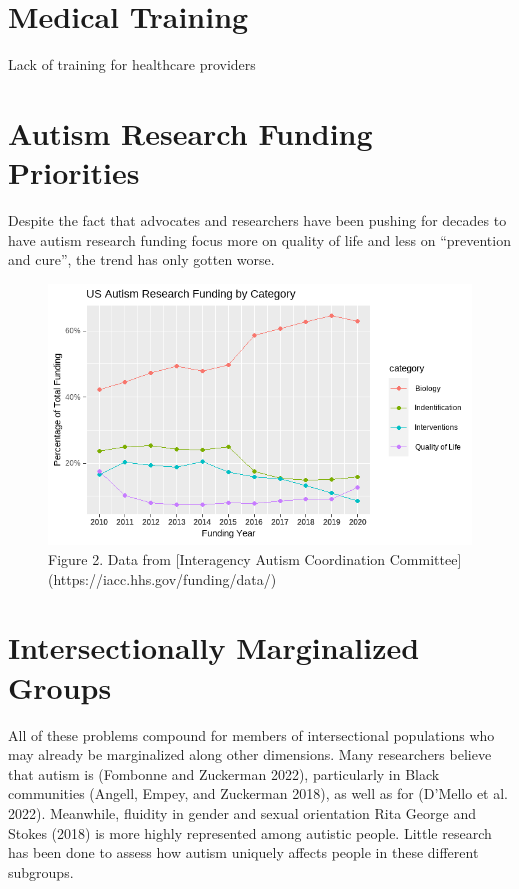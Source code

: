 \documentclass[
  letterpaper,
  DIV=11,
  numbers=noendperiod]{scrreprt}
\begin{document}
\hypertarget{sec-training_for_providers}{%
\section{Medical Training}\label{sec-training_for_providers}}

Lack of training for healthcare providers

\hypertarget{sec-research_funding_providers}{%
\section{Autism Research Funding
Priorities}\label{sec-research_funding_providers}}

Despite the fact that advocates and researchers have been pushing for
decades to have autism research funding focus more on quality of life
and less on ``prevention and cure'', the trend has only gotten worse.

\begin{figure}

{\centering \includegraphics[width=5.4811in,height=\textheight]{././media/image1.png}

}

\caption{Figure 2. Data from {[}Interagency Autism Coordination
Committee{]}(https://iacc.hhs.gov/funding/data/)}

\end{figure}

\hypertarget{sec-marginalized}{%
\section{Intersectionally Marginalized Groups}\label{sec-marginalized}}

All of these problems compound for members of intersectional populations
who may already be marginalized along other dimensions. Many researchers
believe that autism is (Fombonne and Zuckerman 2022), particularly in
Black communities (Angell, Empey, and Zuckerman 2018), as well as for
(D'Mello et al. 2022). Meanwhile, fluidity in gender and sexual
orientation Rita George and Stokes (2018) is more highly represented
among autistic people. Little research has been done to assess how
autism uniquely affects people in these different subgroups.
\end{document}
